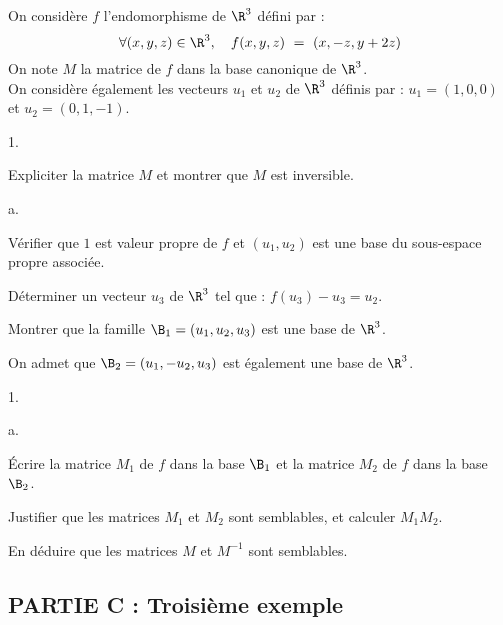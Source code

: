 \documentclass[11pt]{article}%
\begin{document}
\noindent
On considère $f$ l'endomorphisme de $\R^3$ défini par : 
\[
\forall (x, y, z) \in \R^3, \quad f(x, y, z) \ = \ (x, -z, y + 2z)
\]
On note $M$ la matrice de $f$ dans la base canonique de $\R^3$.\\
On considère également les vecteurs $u_1$ et $u_2$ de $\R^3$ définis
par : $u_1 = (1, 0, 0)$ et $u_2 = (0, 1, -1)$.

\begin{noliste}{1.}
  \setlength{\itemsep}{4mm} %
  \setcounter{enumi}{4}
\item Expliciter la matrice $M$ et montrer que $M$ est inversible.

\item
  \begin{noliste}{a.}
    \setlength{\itemsep}{2mm} %
  \item Vérifier que $1$ est valeur propre de $f$ et $(u_1, u_2)$ est
    une base du sous-espace propre associée.

  \item Déterminer un vecteur $u_3$ de $\R^3$ tel que : $f(u_3) - u_3
    = u_2$.

  \item Montrer que la famille $\B_1 = (u_1, u_2, u_3)$ est une base
    de $\R^3$.
  \end{noliste}
\end{noliste}
On admet que $\B_2 = (u_1, -u_2, u_3)$ est également une base de $\R^3$.
\begin{noliste}{1.}
  \setlength{\itemsep}{4mm} %
  \setcounter{enumi}{6}
\item
  \begin{noliste}{a.}
    \setlength{\itemsep}{2mm} %
  \item Écrire la matrice $M_1$ de $f$ dans la base $\B_1$ et la
    matrice $M_2$ de $f$ dans la base $\B_2$.

  \item Justifier que les matrices $M_1$ et $M_2$ sont semblables, et
    calculer $M_1 M_2$.
  \end{noliste}

\item En déduire que les matrices $M$ et $M^{-1}$ sont semblables.
\end{noliste}


\newpage


\subsection*{PARTIE C : Troisième exemple}
\end{document}
